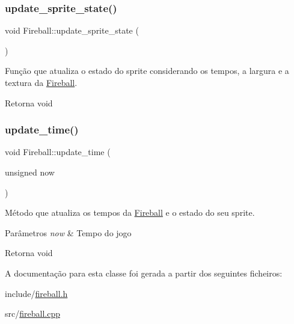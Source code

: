 \subsubsection{\texorpdfstring{update\+\_\+sprite\+\_\+state()}{update\_sprite\_state()}}
{\footnotesize\ttfamily void Fireball\+::update\+\_\+sprite\+\_\+state (\begin{DoxyParamCaption}{ }\end{DoxyParamCaption})\hspace{0.3cm}{\ttfamily [protected]}}



Função que atualiza o estado do sprite considerando os tempos, a largura e a textura da \mbox{\hyperlink{classFireball}{Fireball}}. 

\begin{DoxyReturn}{Retorna}
void 
\end{DoxyReturn}
\mbox{\label{classFireball_a0692c0ef038abdf5128f2bac3bfc5388}} 
\subsubsection{\texorpdfstring{update\+\_\+time()}{update\_time()}}
{\footnotesize\ttfamily void Fireball\+::update\+\_\+time (\begin{DoxyParamCaption}\item[{unsigned}]{now }\end{DoxyParamCaption})\hspace{0.3cm}{\ttfamily [protected]}}



Método que atualiza os tempos da \mbox{\hyperlink{classFireball}{Fireball}} e o estado do seu sprite. 


\begin{DoxyParams}{Parâmetros}
{\em now} & Tempo do jogo \\
\hline
\end{DoxyParams}
\begin{DoxyReturn}{Retorna}
void 
\end{DoxyReturn}


A documentação para esta classe foi gerada a partir dos seguintes ficheiros\+:\begin{DoxyCompactItemize}
\item 
include/\mbox{\hyperlink{fireball_8h}{fireball.\+h}}\item 
src/\mbox{\hyperlink{fireball_8cpp}{fireball.\+cpp}}\end{DoxyCompactItemize}
